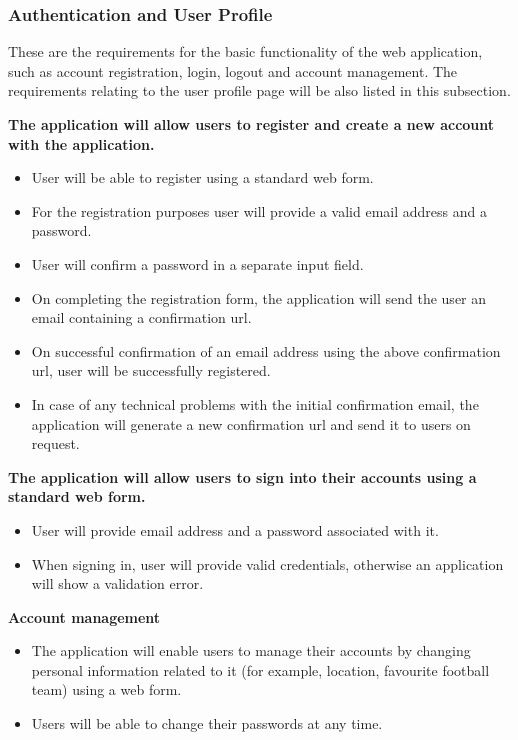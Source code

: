 \subsubsection{Authentication and User Profile}
\label{sec:authandprofile_req}
These are the requirements for the basic functionality of the web application, such as account registration, login, logout and account management. The requirements relating to the user profile page will be also listed in this subsection.

\textbf{The application will allow users to register and create a new account with the application.}
\begin{itemize}
 	\item User will be able to register using a standard web form.
 	\item For the registration purposes user will provide a valid email address and a password.
 	\item User will confirm a password in a separate input field.
 	\item On completing the registration form, the application will send the user an email containing a confirmation url.
 	\item On successful confirmation of an email address using the above confirmation url, user will be successfully registered.
 	\item In case of any technical problems with the initial confirmation email, the application will generate a new confirmation url and send it to users on request.
\end{itemize}

\textbf{The application will allow users to sign into their accounts using a standard web form.}
\begin{itemize}
	\item User will provide email address and a password associated with it.
	\item When signing in, user will provide valid credentials, otherwise an application will show a validation error.
\end{itemize}

\textbf{Account management}
\begin{itemize}
	\item The application will enable users to manage their accounts by changing personal information related to it (for example, location, favourite football team) using a web form.
	\item Users will be able to change their passwords at any time. 
\end{itemize}

